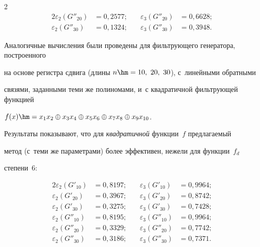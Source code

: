 \begin{multicols}{2}
\begin{alignat*}{2}
    \varepsilon_2\left(G''_{20}\right)&= 0{,}2577; &\quad \varepsilon_3\left(G''_{20}\right)&= 0{,}6628; \\


    \varepsilon_2\left(G''_{30}\right)&= 0{,}1324; &\quad \varepsilon_3\left(G''_{30}\right)&= 0{,}3948. 


\end{alignat*}





Аналогичные вычисления были проведены для фильтрующего генератора, построенного 


на основе регистра сдвига (длины $n\hm = 10,\ 20,\ 30$), с~линейными обратными 


связями, заданными теми же полиномами, и~с квадратичной фильтрующей функцией 


$f(x)\hm=x_1x_2\oplus x_3x_4\oplus x_5x_6\oplus x_7x_8\oplus x_9x_{10}$.





Результаты показывают, что для \textit{квадратичной} функции~$f$ предлагаемый 


метод (с~теми же параметрами) более эффективен, нежели для функции~$f_d$ 


степени~$6$:


\begin{alignat*}{2}


    \varepsilon_2\left(G'_{10}\right)&= 0{,}8197; &\quad \varepsilon_3\left(G'_{10}\right)&= 0{,}9964;  \\


    \varepsilon_2\left(G'_{20}\right)&= 0{,}3967; &\quad \varepsilon_3\left(G'_{20}\right)&= 0{,}8742;  \\


    \varepsilon_2\left(G'_{30}\right)&= 0{,}3275; &\quad \varepsilon_3\left(G'_{30}\right)&= 0{,}7428;  \\


    \varepsilon_2\left(G''_{10}\right)&= 0{,}8195; &\quad \varepsilon_3\left(G''_{10}\right)&= 0{,}9964; \\


    \varepsilon_2\left(G''_{20}\right)&= 0{,}3329; &\quad \varepsilon_3\left(G''_{20}\right)&= 0{,}7742; \\


    \varepsilon_2\left(G''_{30}\right)&= 0{,}3186; &\quad \varepsilon_3\left(G''_{30}\right)&= 0{,}7371. 


\end{alignat*}












\end{multicols}
